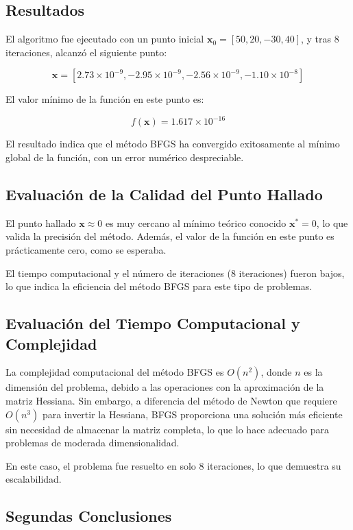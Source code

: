 \documentclass{article}
\begin{document}
	\subsection{Resultados}
	
	El algoritmo fue ejecutado con un punto inicial $\mathbf{x}_0 = [50, 20, -30, 40]$, y tras 8 iteraciones, alcanzó el siguiente punto:
	
	$$
	\mathbf{x} = [2.73 \times 10^{-9}, -2.95 \times 10^{-9}, -2.56 \times 10^{-9}, -1.10 \times 10^{-8}]
	$$
	
	El valor mínimo de la función en este punto es:
	
	$$
	f(\mathbf{x}) = 1.617 \times 10^{-16}
	$$
	
	El resultado indica que el método BFGS ha convergido exitosamente al mínimo global de la función, con un error numérico despreciable.
	
	
	\subsection{Evaluación de la Calidad del Punto Hallado}
	
	El punto hallado $\mathbf{x} \approx 0$ es muy cercano al mínimo teórico conocido $\mathbf{x}^* = 0$, lo que valida la precisión del método. Además, el valor de la función en este punto es prácticamente cero, como se esperaba. 
	
	El tiempo computacional y el número de iteraciones (8 iteraciones) fueron bajos, lo que indica la eficiencia del método BFGS para este tipo de problemas.
	
	\subsection{Evaluación del Tiempo Computacional y Complejidad}
	
	La complejidad computacional del método BFGS es $O(n^2)$, donde $n$ es la dimensión del problema, debido a las operaciones con la aproximación de la matriz Hessiana. Sin embargo, a diferencia del método de Newton que requiere $O(n^3)$ para invertir la Hessiana, BFGS proporciona una solución más eficiente sin necesidad de almacenar la matriz completa, lo que lo hace adecuado para problemas de moderada dimensionalidad.
	
	En este caso, el problema fue resuelto en solo 8 iteraciones, lo que demuestra su escalabilidad.
	
	\subsection{Segundas Conclusiones}
	
\end{document}
